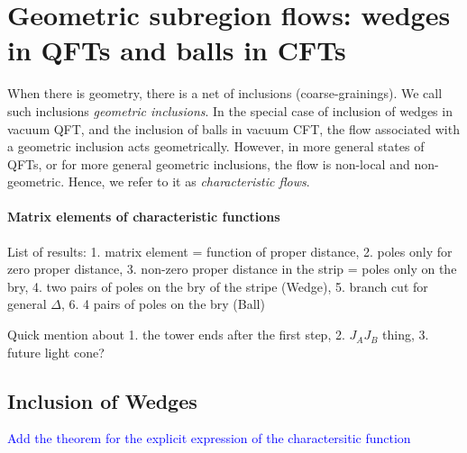 \documentclass[a4paper,11pt]{article}
\theoremstyle{definition}
\newcommand{\NL}[1]{\textcolor{blue}{#1}}
\begin{document}







\section{Geometric subregion flows: wedges in QFTs and balls in CFTs}

When there is geometry, there is a net of inclusions (coarse-grainings). We call such inclusions {\it geometric inclusions}. In the special case of inclusion of wedges in vacuum QFT, and the inclusion of balls in vacuum CFT, the flow associated with a geometric inclusion acts geometrically. However, in more general states of QFTs, or for more general geometric inclusions, the flow is non-local and non-geometric. Hence, we refer to it as {\it characteristic flows}.






\paragraph{Matrix elements of characteristic functions}

List of results: 1. matrix element = function of proper distance, 2. poles only for zero proper distance, 3. non-zero proper distance in the strip = poles only on the bry, 4. two pairs of poles on the bry of the stripe (Wedge), 5. branch cut for general $\Delta$, 6. 4 pairs of poles on the bry (Ball)

Quick mention about 1. the tower ends after the first step, 2. $J_AJ_B$ thing, 3. future light cone?
\subsection{Inclusion of Wedges}
\NL{Add the theorem for the explicit expression of the charactersitic function}
\end{document}
